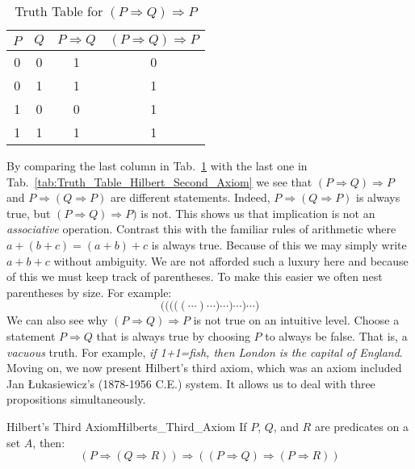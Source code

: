    \begin{table}
        \centering
        \captionsetup{type=table}
        \begin{tabular}{c|c|c|c}
            $P$&$Q$&$P\Rightarrow{Q}$&$(P\Rightarrow{Q})\Rightarrow{P}$\\
            \hline
            0&0&1&0\\
            0&1&1&1\\
            1&0&0&1\\
            1&1&1&1
        \end{tabular}
        \caption{Truth Table for $(P\Rightarrow{Q})\Rightarrow{P}$}
        \label{tab:Truth_Table_P_implies_Q_implies_P}
    \end{table}
    By comparing the last column in
    Tab.~\ref{tab:Truth_Table_P_implies_Q_implies_P} with the last one in
    Tab.~\ref{tab:Truth_Table_Hilbert_Second_Axiom} we see that
    $(P\Rightarrow{Q})\Rightarrow{P}$ and $P\Rightarrow(Q\Rightarrow{P})$ are
    different statements. Indeed, $P\Rightarrow(Q\Rightarrow{P})$ is always
    true, but $(P\Rightarrow{Q})\Rightarrow{P})$ is not. This shows us that
    implication is not an \textit{associative}
    operation. Contrast this with the familiar rules of arithmetic where
    $a+(b+c)=(a+b)+c$ is always true. Because of this we may simply write
    $a+b+c$ without ambiguity. We are not afforded such a luxury here and
    because of this we must keep track of parentheses. To make this easier we
    often nest parentheses by size. For example:
    \begin{equation}
        \Bigg(
            \bigg(
                \Big(
                    \big(
                        (\cdots)\cdots
                    \big)\cdots
                \Big)\cdots
            \bigg)\cdots
        \Bigg)
    \end{equation}
    We can also see why $(P\Rightarrow{Q})\Rightarrow{P}$ is not true on an
    intuitive level. Choose a statement $P\Rightarrow{Q}$ that is always true by
    choosing $P$ to always be false. That is, a \textit{vacuous} truth. For
    example, \textit{if 1+1=fish, then London is the capital of England}.
    Moving on, we now present Hilbert's third axiom, which was an axiom included
    Jan \L{u}kasiewicz's (1878-1956 C.E.) system. It
    allows us to deal with three propositions simultaneously.
    \begin{faxiom}{Hilbert's Third Axiom}{Hilberts_Third_Axiom}
        \label{thm:Lukasiewicz_Second_Axiom}%
        If $P$, $Q$, and $R$ are predicates on a set $A$, then:%
        \begin{equation*}
            (P\Rightarrow(Q\Rightarrow{R}))\Rightarrow
            ((P\Rightarrow{Q})\Rightarrow(P\Rightarrow{R}))
        \end{equation*}
    \end{faxiom}
